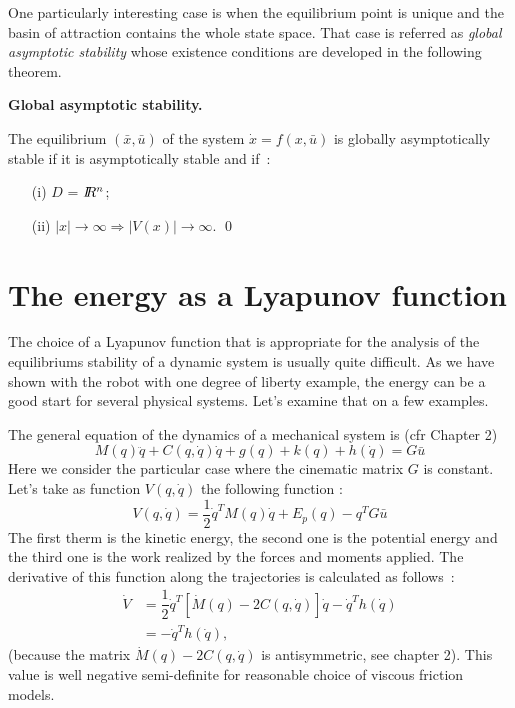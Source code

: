 One particularly interesting case is when the equilibrium point is unique and the basin of attraction contains the whole state space. That case is referred as {\it global asymptotic stability} whose existence conditions are developed in the following theorem.

\begin{theoreme}\label{stabglob}{\bf Global asymptotic stability.}

The equilibrium $(\bar x, \bar u)$ of the system $\dot x = f(x,\bar u)$ is globally asymptotically stable if it is asymptotically stable and if~:\\
\begin{itemize}
\item[(i)] $D$ = $I \! \! R^n$;\\
\item[(ii)] $|x| \rightarrow \infty \Rightarrow |V(x)| \rightarrow \infty$. \qed
\end{itemize}
\end{theoreme}

\section{The energy as a Lyapunov function}

The choice of a Lyapunov function that is appropriate for the analysis of the equilibriums stability of a dynamic system is usually quite difficult.  As we have shown with the robot with one degree of liberty example, the energy can be a good start for several physical systems.  Let's examine that on a few examples.\\


The general equation of the dynamics of a mechanical system is (cfr Chapter 2) 
$$
M(q) \ddot q + C(q, \dot q) \dot q + g(q) +k(q) +h(\dot q) =G \bar u
$$
Here we consider the particular case where the cinematic matrix $G$ is constant.
Let's take as function $V(q, \dot q)$ the following function :
$$
V(q,\dot q) = \frac{1}{2} \dot q^T M(q) \dot q + E_{p}(q) - q^TG \bar u
$$
The first therm is the kinetic energy, the second one is the potential energy and the third one is the work realized by the forces and moments applied.  The derivative of this function along the trajectories is calculated as follows~:
\begin{equation*} \begin{split}
\dot V &=  \dfrac{1}{2} \dot q^T[\dot M(q) -2C(q,\dot q)]\dot q -
\dot q^Th(\dot q)\\
&= -\dot q^Th(\dot q),
\end{split} \end{equation*}
(because the matrix $\dot M(q) -2C(q,\dot q)$ is antisymmetric, see chapter 2). This value is well negative semi-definite for reasonable choice of viscous friction models.\\

